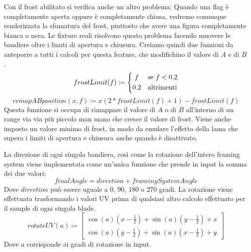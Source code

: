 \documentclass[main.tex]{subfiles}
\begin{document}
Con il frost abilitato si verifica anche un altro problema: Quando una flag è completamente aperta oppure è completamente chiusa, vedremo comunque renderizzata la sfumatura del frost, piuttosto che avere una figura completamente bianca o nera. Le fixture reali risolvono questo problema facendo muovere le bandiere oltre i limiti di apertura e chiusura. Creiamo quindi due funzioni da anteporre a tutti i calcoli per questa feature, che modifichino il valore di $A$ e di $B$. 
\[frostLimit(f) \coloneqq 
	\begin{dcases}
		\hfil f & \text{se } f < 0.2\\
		0.2 & \text{altrimenti}
	\end{dcases}
\]
\[remapABposition(x, f) \coloneqq x(2 * frostLimit(f) + 1) - frostLimit(f)\]
Questa funzione si occupa di rimappare il valore di $A$ o di $B$ all'interno di un range via via più piccolo man mano che cresce il valore di frost. Viene anche imposto un valore minimo di frost, in modo da emulare l'effetto della lama che supera i limiti di apertura e chiusura anche quando è disattivato.
\newline

La direzione di ogni singola bandiera, così come la rotazione dell'intero framing system viene implementata come un'unica funzione \cite{UVrotation} che prende in input la somma dei due valori:
\[finalAngle = direction + framingSystemAngle\]
Dove $direction$ può essere uguale a 0, 90, 180 o 270 gradi. La rotazione viene effettuata trasformando i valori UV prima di qualsiasi altro calcolo effettuato per il sample di ogni singola blade.
\[rotateUV(a) \coloneqq 
	\begin{bmatrix}
		\cos(a)(x - \frac{1}{2}) + \sin(a)(y - \frac{1}{2}) + x \\
		\cos(a)(y - \frac{1}{2}) + \sin(a)(x - \frac{1}{2}) + y
	\end{bmatrix}
\]
Dove $a$ corrisponde ai gradi di rotazione in input.
\end{document}
